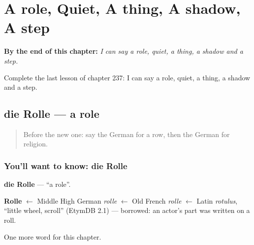 
\chapter{A role, Quiet, A thing, A shadow, A step}
\label{ch:ge-a-role-quiet-a-thing-a-shadow-a-step}

\begin{chapteropening}
\textbf{By the end of this chapter:} \emph{I can say a role, quiet, a thing, a shadow and a step.}

Complete the last lesson of chapter 237: I can say a role, quiet, a thing, a shadow and a step.
\end{chapteropening}

\section[die Rolle]{die Rolle — a role}

\label{lesson:GE-C237-rolle}



\begin{quote}
Before the new one: say the German for a row, then the German for religion.
\end{quote}

\subsection*{You'll want to know: die Rolle}
\textbf{die Rolle} — \textquotedblleft{}a role\textquotedblright{}.

\begin{cousinweb}
\textbf{Rolle} $\leftarrow$ Middle High German \emph{rolle} $\leftarrow$ Old French \emph{rolle} $\leftarrow$ Latin \emph{rotulus}, \textquotedblleft{}little wheel, scroll\textquotedblright{} (EtymDB 2.1) — borrowed: an actor's part was written on a roll.
\end{cousinweb}

\begin{grammarlens}[title={What you've built}]
One more word for this chapter.
\end{grammarlens}

